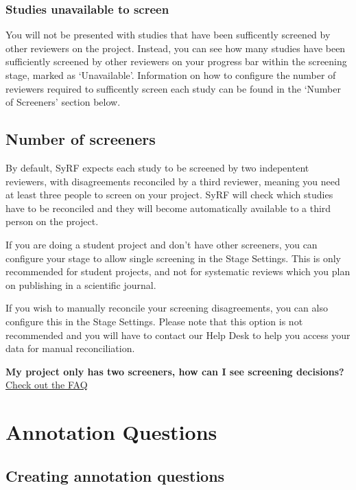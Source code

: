 \documentclass[
]{book}
\begin{document}
\hypertarget{studies-unavailable-to-screen}{%
\subsection{Studies unavailable to screen}\label{studies-unavailable-to-screen}}

You will not be presented with studies that have been sufficently screened by other reviewers on the project. Instead, you can see how many studies have been sufficiently screened by other reviewers on your progress bar within the screening stage, marked as `Unavailable'. Information on how to configure the number of reviewers required to sufficently screen each study can be found in the `Number of Screeners' section below.

\hypertarget{number-of-screeners}{%
\section{Number of screeners}\label{number-of-screeners}}

By default, SyRF expects each study to be screened by two indepentent reviewers, with disagreements reconciled by a third reviewer, meaning you need at least three people to screen on your project. SyRF will check which studies have to be reconciled and they will become automatically available to a third person on the project.

If you are doing a student project and don't have other screeners, you can configure your stage to allow single screening in the Stage Settings. This is only recommended for student projects, and not for systematic reviews which you plan on publishing in a scientific journal.

If you wish to manually reconcile your screening disagreements, you can also configure this in the Stage Settings. Please note that this option is not recommended and you will have to contact our Help Desk to help you access your data for manual reconciliation.

\textbf{My project only has two screeners, how can I see screening decisions?}
\href{https://syrf.org.uk/faq}{Check out the FAQ}

\hypertarget{projectannotation}{%
\chapter{Annotation Questions}\label{projectannotation}}

\hypertarget{creating-annotation-questions}{%
\section{Creating annotation questions}\label{creating-annotation-questions}}
\end{document}
